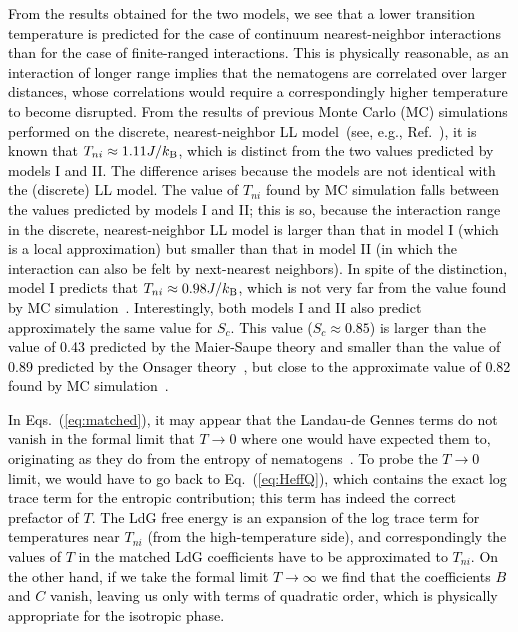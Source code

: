 \documentclass[jcp,aps,twocolumn,showpacs,supergroupedaddress,epsfig,amsmath,amssymb,eqsecnum]{revtex4}
\newcommand{\bing}[1]{\textcolor{black}{#1}}
\begin{document}
\bing{From the results obtained for the two models, we see that a lower transition temperature is predicted for the case of continuum nearest-neighbor interactions than for the case of finite-ranged interactions. This is physically reasonable, as an interaction of longer range implies that the nematogens are correlated over larger distances, whose correlations would require a correspondingly higher temperature to become disrupted. From the results of previous Monte Carlo (MC) simulations performed on the discrete, nearest-neighbor LL model~(see, e.g., Ref.~\cite{shekhar2012}), it is known that $T_{ni} \approx 1.11 J/k_{{\rm B}}$, which is distinct from the two values predicted by models I and II. The difference arises because the models are not identical with the (discrete) LL model. The value of $T_{ni}$ found by MC simulation falls between the values predicted by models I and II; this is so, because the interaction range in the discrete, nearest-neighbor LL model is larger than that in model I (which is a local approximation) but smaller than that in model II (in which the interaction can also be felt by next-nearest neighbors). In spite of the distinction, model I predicts that $T_{ni} \approx 0.98 J/k_{{\rm B}}$, which is not very far from the value found by MC simulation~\cite{shekhar2012}. Interestingly, both models I and II also predict approximately the same value for $S_c$. This value ($S_c \approx 0.85$) is larger than the value of 0.43 predicted by the Maier-Saupe theory and smaller than the value of 0.89 predicted by the Onsager theory~\cite{chandrasekhar,degennes-prost}, but close to the approximate value of 0.82 found by MC simulation~\cite{shekhar2012}.} 

\bing{In Eqs.~(\ref{eq:matched}), it may appear that the Landau-de Gennes terms do not vanish in the formal limit that $T \rightarrow 0$ where one would have expected them to, originating as they do from the entropy of nematogens~\cite{katriel1986,luckhurst2012}. To probe the $T\rightarrow 0$ limit, we would have to go back to Eq.~(\ref{eq:HeffQ}), which contains the exact log trace term for the entropic contribution; this term has indeed the correct prefactor of $T$. The LdG free energy is an expansion of the log trace term for temperatures near $T_{ni}$ (from the high-temperature side), and correspondingly the values of $T$ in the matched LdG coefficients have to be approximated to $T_{ni}$. On the other hand, if we take the formal limit $T \rightarrow \infty$ we find that the coefficients $B$ and $C$ vanish, leaving us only with terms of quadratic order, which is physically appropriate for the isotropic phase.} 
\end{document}
